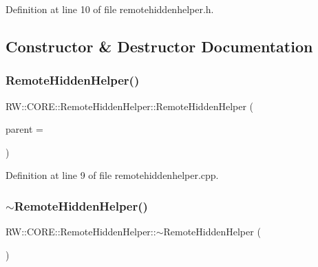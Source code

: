 Definition at line 10 of file remotehiddenhelper.\+h.



\subsection{Constructor \& Destructor Documentation}
\hypertarget{class_r_w_1_1_c_o_r_e_1_1_remote_hidden_helper_a605994a170cd9a99b270159662d14d97}{}\label{class_r_w_1_1_c_o_r_e_1_1_remote_hidden_helper_a605994a170cd9a99b270159662d14d97} 
\subsubsection{\texorpdfstring{Remote\+Hidden\+Helper()}{RemoteHiddenHelper()}}
{\footnotesize\ttfamily R\+W\+::\+C\+O\+R\+E\+::\+Remote\+Hidden\+Helper\+::\+Remote\+Hidden\+Helper (\begin{DoxyParamCaption}\item[{Q\+Object $\ast$}]{parent = {} }\end{DoxyParamCaption})}



Definition at line 9 of file remotehiddenhelper.\+cpp.

\hypertarget{class_r_w_1_1_c_o_r_e_1_1_remote_hidden_helper_ac7e3c2bbb6a671aa2cd5cfb39b70f28e}{}\label{class_r_w_1_1_c_o_r_e_1_1_remote_hidden_helper_ac7e3c2bbb6a671aa2cd5cfb39b70f28e} 
\subsubsection{\texorpdfstring{$\sim$\+Remote\+Hidden\+Helper()}{~RemoteHiddenHelper()}}
{\footnotesize\ttfamily R\+W\+::\+C\+O\+R\+E\+::\+Remote\+Hidden\+Helper\+::$\sim$\+Remote\+Hidden\+Helper (\begin{DoxyParamCaption}{ }\end{DoxyParamCaption})}



